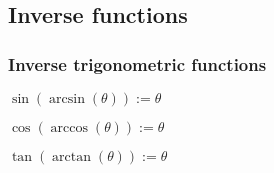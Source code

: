 
\subsection{Inverse functions}

\subsubsection{Inverse trigonometric functions}

\(\sin (\arcsin (\theta )):=\theta \)

\(\cos (\arccos (\theta )):=\theta \)

\(\tan (\arctan (\theta )):=\theta \)
